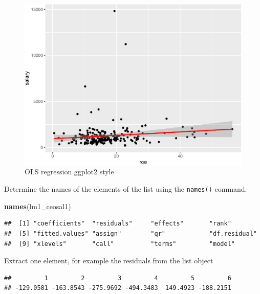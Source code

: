 \documentclass[]{book}
\newenvironment{Shaded}{\begin{snugshade}}{\end{snugshade}}
\newcommand{\CommentTok}[1]{\textcolor[rgb]{0.56,0.35,0.01}{\textit{#1}}}
\newcommand{\KeywordTok}[1]{\textcolor[rgb]{0.13,0.29,0.53}{\textbf{#1}}}
\newcommand{\NormalTok}[1]{#1}
\newcommand{\OperatorTok}[1]{\textcolor[rgb]{0.81,0.36,0.00}{\textbf{#1}}}
\begin{document}
\begin{figure}

{\centering \includegraphics[width=0.8\linewidth]{MEM5220_R_files/figure-latex/fig2-1} 

}

\caption{OLS regression ggplot2 style}\label{fig:fig2}
\end{figure}

Determine the names of the elements of the list using the
\texttt{names()} command.

\begin{Shaded}
\begin{Highlighting}[]
\KeywordTok{names}\NormalTok{(lm1_ceosal1)}
\end{Highlighting}
\end{Shaded}

\begin{verbatim}
##  [1] "coefficients"  "residuals"     "effects"       "rank"         
##  [5] "fitted.values" "assign"        "qr"            "df.residual"  
##  [9] "xlevels"       "call"          "terms"         "model"
\end{verbatim}

Extract one element, for example the residuals from the list object

\begin{Shaded}
\end{Shaded}

\begin{verbatim}
##         1         2         3         4         5         6 
## -129.0581 -163.8543 -275.9692 -494.3483  149.4923 -188.2151
\end{verbatim}
\end{document}
